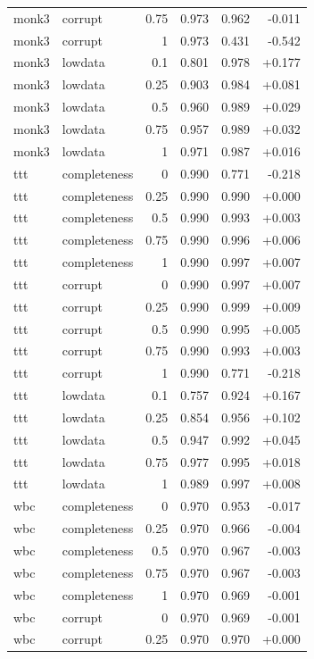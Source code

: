 \begin{table}[t]
\begin{tabular}{llrrrr}
monk3 & corrupt & 0.75 & 0.973 & 0.962 & -0.011 \\
monk3 & corrupt & 1 & 0.973 & 0.431 & -0.542 \\
monk3 & lowdata & 0.1 & 0.801 & 0.978 & +0.177 \\
monk3 & lowdata & 0.25 & 0.903 & 0.984 & +0.081 \\
monk3 & lowdata & 0.5 & 0.960 & 0.989 & +0.029 \\
monk3 & lowdata & 0.75 & 0.957 & 0.989 & +0.032 \\
monk3 & lowdata & 1 & 0.971 & 0.987 & +0.016 \\
ttt & completeness & 0 & 0.990 & 0.771 & -0.218 \\
ttt & completeness & 0.25 & 0.990 & 0.990 & +0.000 \\
ttt & completeness & 0.5 & 0.990 & 0.993 & +0.003 \\
ttt & completeness & 0.75 & 0.990 & 0.996 & +0.006 \\
ttt & completeness & 1 & 0.990 & 0.997 & +0.007 \\
ttt & corrupt & 0 & 0.990 & 0.997 & +0.007 \\
ttt & corrupt & 0.25 & 0.990 & 0.999 & +0.009 \\
ttt & corrupt & 0.5 & 0.990 & 0.995 & +0.005 \\
ttt & corrupt & 0.75 & 0.990 & 0.993 & +0.003 \\
ttt & corrupt & 1 & 0.990 & 0.771 & -0.218 \\
ttt & lowdata & 0.1 & 0.757 & 0.924 & +0.167 \\
ttt & lowdata & 0.25 & 0.854 & 0.956 & +0.102 \\
ttt & lowdata & 0.5 & 0.947 & 0.992 & +0.045 \\
ttt & lowdata & 0.75 & 0.977 & 0.995 & +0.018 \\
ttt & lowdata & 1 & 0.989 & 0.997 & +0.008 \\
wbc & completeness & 0 & 0.970 & 0.953 & -0.017 \\
wbc & completeness & 0.25 & 0.970 & 0.966 & -0.004 \\
wbc & completeness & 0.5 & 0.970 & 0.967 & -0.003 \\
wbc & completeness & 0.75 & 0.970 & 0.967 & -0.003 \\
wbc & completeness & 1 & 0.970 & 0.969 & -0.001 \\
wbc & corrupt & 0 & 0.970 & 0.969 & -0.001 \\
wbc & corrupt & 0.25 & 0.970 & 0.970 & +0.000 \\

\end{tabular}
\end{table}
